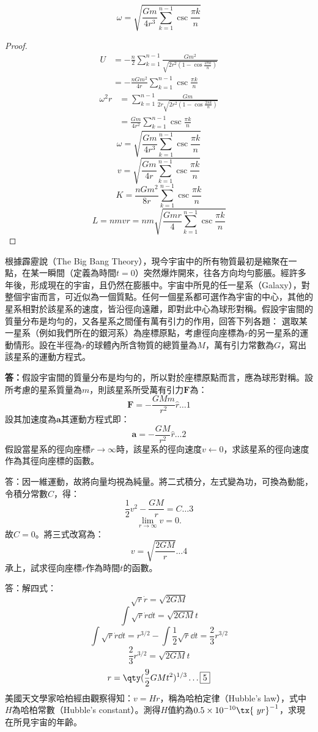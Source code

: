 \documentclass[a4paper,12pt]{article}
\begin{document}
\[\omega=\sqrt{\frac{Gm}{4r^3}\sum_{k=1}^{n-1}\csc\frac{\pi k}{n}}\]
\begin{proof}
\[\begin{aligned}
U&=-\frac{n}{2}\sum_{k=1}^{n-1}\frac{Gm^2}{\sqrt{2r^2\left(1-\cos\frac{2\pi k}{n}\right)}}\\
&=-\frac{nGm^2}{4r}\sum_{k=1}^{n-1}\csc\frac{\pi k}{n}
\end{aligned}\]
\[\begin{aligned}
\omega^2r&=\sum_{k=1}^{n-1}\frac{Gm}{2r\sqrt{2r^2\left(1-\cos\frac{2\pi k}{n}\right)}}\\
&=\frac{Gm}{4r^2}\sum_{k=1}^{n-1}\csc\frac{\pi k}{n}
\end{aligned}\]
\[\omega=\sqrt{\frac{Gm}{4r^3}\sum_{k=1}^{n-1}\csc\frac{\pi k}{n}}\]
\[v=\sqrt{\frac{Gm}{4r}\sum_{k=1}^{n-1}\csc\frac{\pi k}{n}}\]
\[K=\frac{nGm^2}{8r}\sum_{k=1}^{n-1}\csc\frac{\pi k}{n}\]
\[L=nmvr=nm\sqrt{\frac{Gmr}{4}\sum_{k=1}^{n-1}\csc\frac{\pi k}{n}}\]
\end{proof}
根據霹靂說（The Big Bang Theory），現今宇宙中的所有物質最初是縮聚在一點，在某一瞬間（定義為時間$t=0$）突然爆炸開來，往各方向均勻膨脹。經許多年後，形成現在的宇宙，且仍然在膨脹中。宇宙中所見的任一星系（Galaxy），對整個宇宙而言，可近似為一個質點。任何一個星系都可選作為宇宙的中心，其他的星系相對於該星系的速度，皆沿徑向遠離，即對此中心為球形對稱。假設宇宙間的質量分布是均勻的，又各星系之間僅有萬有引力的作用，回答下列各題：
選取某一星系（例如我們所在的銀河系）為座標原點，考慮徑向座標為$r$的另一星系的運動情形。設在半徑為$r$的球體內所含物質的總質量為$M$，萬有引力常數為$G$，寫出該星系的運動方程式。 

\textbf{答：}假設宇宙間的質量分布是均勻的，所以對於座標原點而言，應為球形對稱。設所考慮的星系質量為$m$，則該星系所受萬有引力$\mathbf{F}$為：
\[\mathbf{F}=-\frac{GMm}{r^2}\hat{r}\ldots\boxed{1}\]
設其加速度為$\mathbf{a}$其運動方程式即：
\[\mathbf{a}=-\frac{GM}{r^2}\hat{r}\ldots\boxed{2}\]
假設當星系的徑向座標$r\to\infty$時，該星系的徑向速度$v\leftarrow 0$，求該星系的徑向速度作為其徑向座標的函數。 

答：因一維運動，故將向量均視為純量。將二式積分，左式變為功，可換為動能，令積分常數$C$，得：
\[\frac{1}{2}v^2-\frac{GM}{r}=C\ldots\boxed{3}\]
\[\lim_{r\to\infty}v=0.\]
故$C=0$。將三式改寫為：
\[v=\sqrt{\frac{2GM}{r}}\ldots\boxed{4}\]
承上，試求徑向座標$r$作為時間$t$的函數。 

答：解四式：
\[\sqrt{r}\dot{r}=\sqrt{2GM}\]
\[\int\sqrt{r}\dot{r}\dd{t}=\sqrt{2GM}t\]
\[\int\sqrt{r}\dot{r}\dd{t}=r^{3/2}-\int \frac{1}{2}\sqrt{r}\dd{t}=\frac{2}{3}r^{3/2}\]
\[\frac{2}{3}r^{3/2}=\sqrt{2GM}t\]
\[r=\qty(\frac{9}{2}GMt^2)^{1/3}\ldots\boxed{5}\]
美國天文學家哈柏經由觀察得知：$v=Hr$，稱為哈柏定律（Hubble's law），式中$H$為哈柏常數（Hubble's constant）。測得$H$值約為$0.5\times 10^{-10}\tx{\ yr}^{-1}$，求現在所見宇宙的年齡。 
\end{document}
